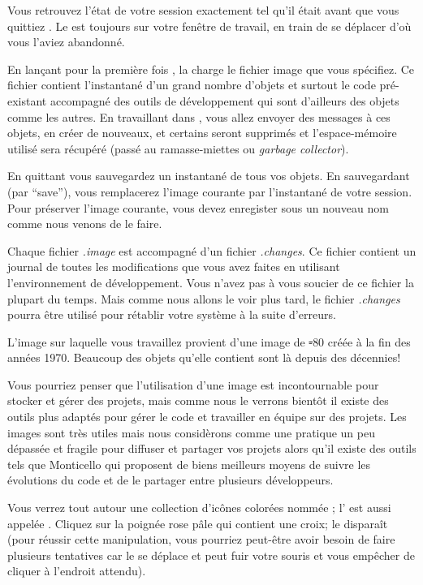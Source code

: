 \documentclass[a4paper,10pt,twoside]{book}
\begin{document}

Vous retrouvez l'état de votre session exactement tel qu'il était
avant que vous quittiez \sq. Le \blobmorph est toujours sur votre
fenêtre de travail, en train de se déplacer d'o\`u vous l'aviez abandonné.

En lançant pour la première fois \sq, la 
charge le fichier image que vous spécifiez. Ce fichier contient
l'instantané d'un grand nombre d'objets et surtout le code
pré-existant accompagné des outils de développement qui sont
d'ailleurs des objets comme les autres. En travaillant dans \sq, vous
allez envoyer des messages à ces objets, en créer de nouveaux, et
certains seront supprimés et l'espace-mémoire utilisé sera récupéré
(\ie pass\'e au ramasse-miettes ou \emph{garbage collector}).

En quittant \sq vous sauvegardez un instantané de tous vos objets. En sauvegardant (par ``save''), vous remplacerez l'image courante par l'instantané de votre session. Pour préserver l'image courante, vous devez enregister sous un nouveau nom comme nous venons de le faire.

Chaque fichier \emph{.image} est accompagné d'un fichier \emph{.changes}.
Ce fichier contient un journal de toutes les modifications que vous avez faites en utilisant l'environnement de développement.
Vous n'avez pas à vous soucier de ce fichier la plupart du temps.
Mais comme nous allons le voir plus tard, le fichier \emph{.changes} pourra être utilisé pour rétablir votre système \sq à la suite d'erreurs.

L'image sur laquelle vous travaillez provient d'une image de \st-80 créée à la fin des années 1970.
Beaucoup des objets qu'elle contient sont là depuis des décennies!

Vous pourriez penser que l'utilisation d'une image est incontournable pour stocker et gérer des projets, mais comme nous le verrons bientôt il existe des outils plus adaptés pour gérer le code et travailler en équipe sur des projets.
Les images sont très utiles mais nous considèrons comme une pratique un peu dépassée et fragile pour diffuser et partager vos projets alors qu'il existe des outils tels que Monticello qui proposent de biens meilleurs moyens de suivre les évolutions du code et de le partager entre plusieurs développeurs.


Vous verrez tout autour une collection d'icônes colorées nomm\'ee
; l'
 est aussi appel\'ee .
Cliquez sur la poignée rose p\^ale qui contient une croix; le
\blobmorph disparaît (pour réussir cette manipulation, vous pourriez
peut-être avoir besoin de faire plusieurs tentatives car le \blobmorph
se déplace et peut fuir votre souris et vous empêcher de cliquer à
l'endroit attendu).
\end{document}
